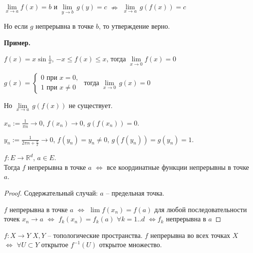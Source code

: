 $\underset{x \rightarrow a}{\lim} f(x) = b$ и
$\underset{y \rightarrow b}{\lim} \, g(y) = c$ $\nRightarrow$ 
$\underset{x \rightarrow a}{\lim} \, g(f(x)) = c$

\notice Но если $g$ непрерывна в точке $b$, то утверждение верно.

\textbf{Пример.}

$f(x) = x \sin \frac 1 x$, $-x \leqslant f(x) \leqslant x$, тогда
$\underset{x \rightarrow 0}{\lim} f(x) = 0$

$g(x) = \begin{cases}
    0 \text{ при } x = 0, \\
    1 \text{ при } x \neq 0
\end{cases}$ тогда $\underset{x \rightarrow 0}{\lim} \, g(x) = 0$

Но $\underset{x \rightarrow a}{\lim} \, g(f(x))$ не существует.

$x_n := \frac {1}{\pi n} \rightarrow 0$, $f(x_n) \rightarrow 0$,
$g(f(x_n)) = 0$.

$y_n := \frac{1}{2 \pi n + \frac{\pi}{2}} \rightarrow 0$,
$f(y_n) = y_n \neq 0$, $g(f(y_n)) = g(y_n) = 1$.

\begin{theorem-non}
\end{theorem-non}
$f : E \rightarrow \mathbb{R}^d$, $a \in E$. \\
Тогда $f$ непрерывна в точке $a$ $\Longleftrightarrow$ все координатные
функции непрерывны в точке $a$.

\begin{proof} Содержательный случай: $a$ -- предельная точка.

    $f$ непрерывна в точке $a$ $\Longleftrightarrow$ $\lim f(x_n) = f(a)$
    для любой последовательности точек $x_n \rightarrow a$
    $\Longleftrightarrow$ $f_k(x_n) = f_k(a) \,\, \forall k = 1..d$
    $\Longleftrightarrow f_k$ непрерывна в $a$

\end{proof}

\begin{theorem-non}
\end{theorem-non}

$f : X \rightarrow Y$ $X, Y$ -- топологические пространства.
$f$ непрерывна во всех точках $X$ $\Longleftrightarrow$
$\forall U \subset Y$ открытое $f^{-1}(U)$ открытое множество.

